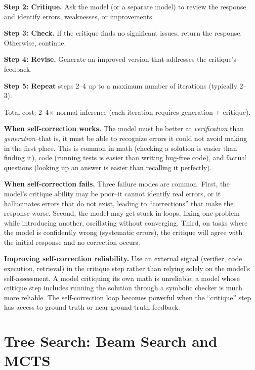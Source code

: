 \begin{chapterenv}
\begin{infobox}
\textbf{Step 2: Critique.} Ask the model (or a separate model) to review the response and identify errors, weaknesses, or improvements.

\textbf{Step 3: Check.} If the critique finds no significant issues, return the response. Otherwise, continue.

\textbf{Step 4: Revise.} Generate an improved version that addresses the critique's feedback.

\textbf{Step 5: Repeat} steps 2--4 up to a maximum number of iterations (typically 2--3).

Total cost: 2--4$\times$ normal inference (each iteration requires generation + critique).
\end{infobox}

\textbf{When self-correction works.} The model must be better at \textit{verification} than \textit{generation}--that is, it must be able to recognize errors it could not avoid making in the first place. This is common in math (checking a solution is easier than finding it), code (running tests is easier than writing bug-free code), and factual questions (looking up an answer is easier than recalling it perfectly).

\textbf{When self-correction fails.} Three failure modes are common. First, the model's critique ability may be poor--it cannot identify real errors, or it hallucinates errors that do not exist, leading to ``corrections'' that make the response worse. Second, the model may get stuck in loops, fixing one problem while introducing another, oscillating without converging. Third, on tasks where the model is confidently wrong (systematic errors), the critique will agree with the initial response and no correction occurs.

\begin{tipbox}
\textbf{Improving self-correction reliability.} Use an external signal (verifier, code execution, retrieval) in the critique step rather than relying solely on the model's self-assessment. A model critiquing its own math is unreliable; a model whose critique step includes running the solution through a symbolic checker is much more reliable. The self-correction loop becomes powerful when the ``critique'' step has access to ground truth or near-ground-truth feedback.
\end{tipbox}

\section{Tree Search: Beam Search and MCTS}


\end{chapterenv}
